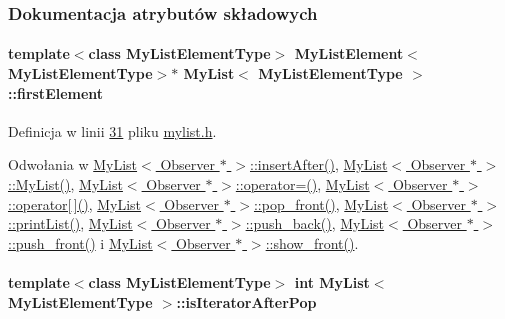 \subsubsection{Dokumentacja atrybutów składowych}
\hypertarget{class_my_list_a15131c9e2f10a393a916c64e901a1290}{
\paragraph[{first\-Element}]{\setlength{\rightskip}{0pt plus 5cm}template$<$class My\-List\-Element\-Type$>$ {\bf My\-List\-Element}$<$My\-List\-Element\-Type$>$$\ast$ {\bf My\-List}$<$ My\-List\-Element\-Type $>$\-::first\-Element}}\label{class_my_list_a15131c9e2f10a393a916c64e901a1290}


Definicja w linii \hyperlink{mylist_8h_source_l00031}{31} pliku \hyperlink{mylist_8h_source}{mylist.\-h}.



Odwołania w \hyperlink{mylist_8h_source_l00212}{My\-List$<$ Observer $\ast$ $>$\-::insert\-After()}, \hyperlink{mylist_8h_source_l00039}{My\-List$<$ Observer $\ast$ $>$\-::\-My\-List()}, \hyperlink{mylist_8h_source_l00234}{My\-List$<$ Observer $\ast$ $>$\-::operator=()}, \hyperlink{mylist_8h_source_l00171}{My\-List$<$ Observer $\ast$ $>$\-::operator\mbox{[}$\,$\mbox{]}()}, \hyperlink{mylist_8h_source_l00098}{My\-List$<$ Observer $\ast$ $>$\-::pop\-\_\-front()}, \hyperlink{mylist_8h_source_l00156}{My\-List$<$ Observer $\ast$ $>$\-::print\-List()}, \hyperlink{mylist_8h_source_l00112}{My\-List$<$ Observer $\ast$ $>$\-::push\-\_\-back()}, \hyperlink{mylist_8h_source_l00125}{My\-List$<$ Observer $\ast$ $>$\-::push\-\_\-front()} i \hyperlink{mylist_8h_source_l00139}{My\-List$<$ Observer $\ast$ $>$\-::show\-\_\-front()}.

\hypertarget{class_my_list_a1041f18464ae98367844d13aa2e7b5a6}{
\paragraph[{is\-Iterator\-After\-Pop}]{\setlength{\rightskip}{0pt plus 5cm}template$<$class My\-List\-Element\-Type$>$ int {\bf My\-List}$<$ My\-List\-Element\-Type $>$\-::is\-Iterator\-After\-Pop}}\label{class_my_list_a1041f18464ae98367844d13aa2e7b5a6}


